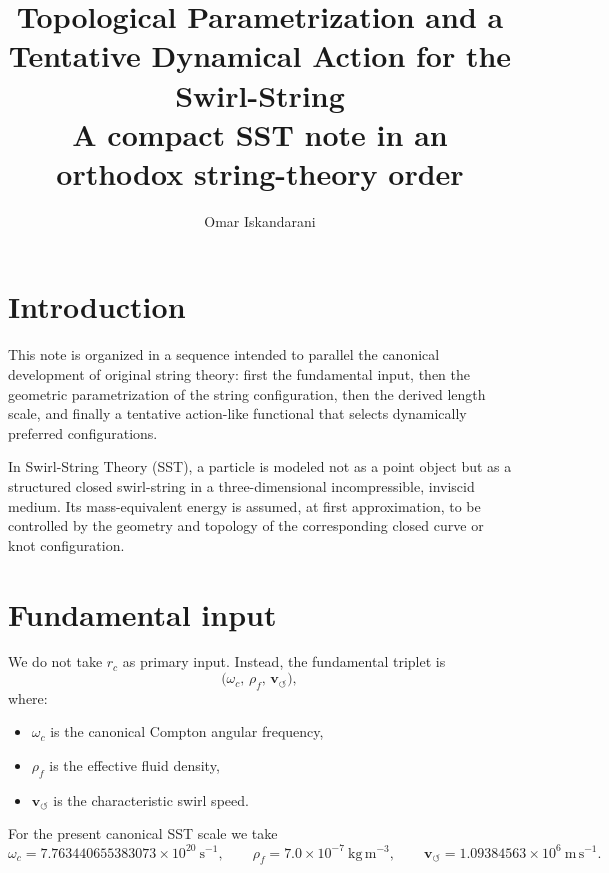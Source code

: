 \documentclass[12pt,a4paper]{article}
\title{\textbf{Topological Parametrization and a Tentative Dynamical Action for the Swirl-String}\\
\large A compact SST note in an orthodox string-theory order}
\author{Omar Iskandarani}
\date{}
\begin{document}
    \maketitle
    
    \section{Introduction}
        
        This note is organized in a sequence intended to parallel the canonical development of original string theory: first the fundamental input, then the geometric parametrization of the string configuration, then the derived length scale, and finally a tentative action-like functional that selects dynamically preferred configurations.
        
        In Swirl-String Theory (SST), a particle is modeled not as a point object but as a structured closed swirl-string in a three-dimensional incompressible, inviscid medium. Its mass-equivalent energy is assumed, at first approximation, to be controlled by the geometry and topology of the corresponding closed curve or knot configuration.
    
    \section{Fundamental input}
        
        We do not take \(r_c\) as primary input. Instead, the fundamental triplet is
        \[
            \bigl(\omega_c,\,\rho_{\!f},\,\mathbf{v}_{\!\boldsymbol{\circlearrowleft}}\bigr),
        \]
        where:
        \begin{itemize}
            \item \(\omega_c\) is the canonical Compton angular frequency,
            \item \(\rho_{\!f}\) is the effective fluid density,
            \item \(\mathbf{v}_{\!\boldsymbol{\circlearrowleft}}\) is the characteristic swirl speed.
        \end{itemize}
        
        For the present canonical SST scale we take
        \[
            \omega_c = 7.763440655383073\times 10^{20}\ \mathrm{s^{-1}},
            \qquad
            \rho_{\!f} = 7.0\times 10^{-7}\ \mathrm{kg\,m^{-3}},
            \qquad
            \mathbf{v}_{\!\boldsymbol{\circlearrowleft}} = 1.09384563\times 10^6\ \mathrm{m\,s^{-1}}.
        \]
        
\end{document}
